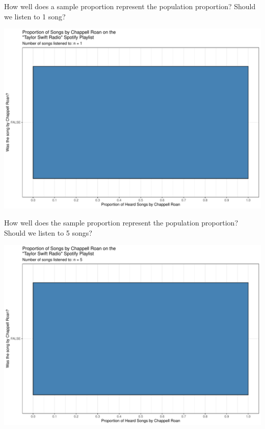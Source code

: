 \documentclass[
  ignorenonframetext,
]{beamer}
\begin{document}
\begin{frame}{How well does a sample proportion represent the population
proportion?}
\label{how-well-does-a-sample-proportion-represent-the-population-proportion}
Should we listen to 1 song?

\includegraphics{class09_files/figure-beamer/unnamed-chunk-6-1.pdf}
\end{frame}

\begin{frame}{How well does the sample proportion represent the
population proportion?}
\label{how-well-does-the-sample-proportion-represent-the-population-proportion}
Should we listen to 5 songs?

\includegraphics{class09_files/figure-beamer/unnamed-chunk-7-1.pdf}
\end{frame}
\end{document}
